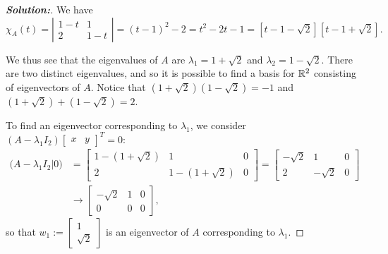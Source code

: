 \documentclass[a4paper]{amsart}
\theoremstyle{definition}
\newenvironment{solution}{\begin{proof}[\textbf{Solution:}] \vphantom{u}}{\end{proof}}
\begin{document}
\begin{solution}
 \def\Fiba{\textstyle 1+\sqrt{2}}
 \def\Fibb{\textstyle 1-\sqrt{2}}

 We have
 $$
 \chi_A(t) = \left|  \begin{array}{cc}1-t & 1\\2& 1-t
 \end{array} \right| = (t-1)^2 -2 = t^2 - 2t - 1 =
 \left[t - 1-\sqrt{2}\right]\left[t -
 1+\sqrt{2}\right].
 $$

 We thus see that the eigenvalues of $A$ are $\lambda_1 = \Fiba$ and
 $\lambda_2 = \Fibb$. There are two distinct eigenvalues, and so it
 is possible to find a basis for ${\mathbb{R}}^2$ consisting of eigenvectors of
 $A$. Notice that $(\Fiba)(\Fibb) = -1$ and
 $(\Fiba) + (\Fibb) = 2$.

 To find an eigenvector corresponding to $\lambda_1$, we consider
 $(A - \lambda_1I_2)\left[
 \begin{array}{cc}x & y
 \end{array} \right]^T = 0$:
 \begin{align*}
 \big(A - \lambda_1I_2|0\big) &= \left[ \begin{array}{cc|c} 1 -
 (\Fiba) & 1& 0\\ 2 &1 -(\Fiba) & 0\end{array} \right] = \left[
 \begin{array}{cc|c} -\sqrt{2} & 1 & 0\\ 2 & -\sqrt{2} & 0
 \end{array} \right]\\ & \to \left[ \begin{array}{cc|c}
 -\sqrt{2} & 1 & 0\\0 & 0 & 0
 \end{array} \right],
 \end{align*}
 so that $w_1 := \left[ \begin{array}{c}1\\ \sqrt{2}
 \end{array} \right]$ is an eigenvector of $A$ corresponding to
 $\lambda_1$.


\end{solution}
\end{document}
